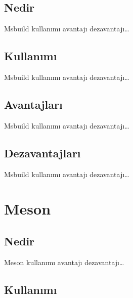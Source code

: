 \documentclass[
]{book}
\begin{document}
\hypertarget{nedir-3}{%
\section*{Nedir}\label{nedir-3}}

Msbuild kullanımı avantajı dezavantajı\ldots{}

\hypertarget{kullanux131mux131-3}{%
\section*{Kullanımı}\label{kullanux131mux131-3}}

Msbuild kullanımı avantajı dezavantajı\ldots{}

\hypertarget{avantajlarux131-3}{%
\section*{Avantajları}\label{avantajlarux131-3}}

Msbuild kullanımı avantajı dezavantajı\ldots{}

\hypertarget{dezavantajlarux131-3}{%
\section*{Dezavantajları}\label{dezavantajlarux131-3}}

Msbuild kullanımı avantajı dezavantajı\ldots{}

\hypertarget{meson}{%
\chapter*{Meson}\label{meson}}

\hypertarget{nedir-4}{%
\section*{Nedir}\label{nedir-4}}

Meson kullanımı avantajı dezavantajı\ldots{}

\hypertarget{kullanux131mux131-4}{%
\section*{Kullanımı}\label{kullanux131mux131-4}}
\end{document}

